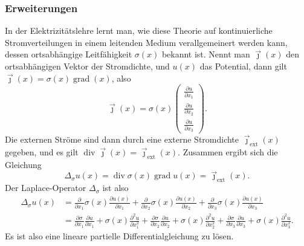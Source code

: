 \subsubsection{Erweiterungen}
In der Elektrizitätslehre lernt man, wie diese Theorie auf kontinuierliche
Stromverteilungen in einem leitenden Medium verallgemeinert werden kann,
dessen ortsabhängige Leitfähigkeit $\sigma(x)$ bekannt ist.
Nennt man $\vec\jmath(x)$ den ortsabhängigen
Vektor der Stromdichte, und $u(x)$ das Potential, dann gilt
$\vec\jmath(x)=\sigma(x)\operatorname{grad}(x)$, also
\[
\vec\jmath(x)=\sigma(x)\begin{pmatrix}
\frac{\partial u}{\partial x_1}\\
\frac{\partial u}{\partial x_2}\\
\frac{\partial u}{\partial x_3}
\end{pmatrix}.
\]
Die externen Ströme sind dann durch eine externe Stromdichte
$\vec\jmath_{\text{ext}}(x)$ gegeben, und es gilt
$\operatorname{div}\vec\jmath(x)=\vec\jmath_{\text{ext}}(x)$. Zusammen ergibt
sich die Gleichung
\[
\Delta_{\sigma}u(x)=\operatorname{div}\sigma(x)\operatorname{grad} u(x)=\vec\jmath_{\text{ext}}(x).
\]
Der Laplace-Operator $\Delta_\sigma$ ist also
\begin{align*}
\Delta_\sigma u(x)&=
\frac{\partial}{\partial x_1}\sigma(x)\frac{\partial u(x)}{\partial x_1}
+
\frac{\partial}{\partial x_2}\sigma(x)\frac{\partial u(x)}{\partial x_2}
+
\frac{\partial}{\partial x_3}\sigma(x)\frac{\partial u(x)}{\partial x_3}
\\
&=
\frac{\partial\sigma}{\partial x_1}\frac{\partial u}{\partial x_1}
+\sigma(x)\frac{\partial^2 u}{\partial x_1^2}+
\frac{\partial\sigma}{\partial x_2}\frac{\partial u}{\partial x_2}
+\sigma(x)\frac{\partial^2 u}{\partial x_2^2}+
\frac{\partial\sigma}{\partial x_3}\frac{\partial u}{\partial x_3}
+\sigma(x)\frac{\partial^2 u}{\partial x_3^2}.
\end{align*}
Es ist also eine lineare partielle Differentialgleichung zu lösen.

